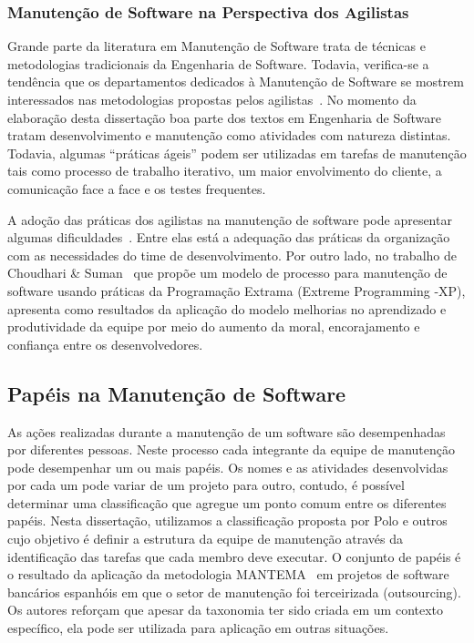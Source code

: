 \subsubsection{Manutenção de Software na Perspectiva dos Agilistas}
\label{sub:manutenção_de_software_com_método_dos_agilistas}

Grande parte da literatura em Manutenção de Software trata de técnicas e
metodologias tradicionais da Engenharia de Software. Todavia, verifica-se a
tendência que os departamentos dedicados à Manutenção de Software se mostrem
interessados nas metodologias propostas pelos agilistas~\cite{Heeager2015}.  No
momento da elaboração desta dissertação boa parte dos textos em Engenharia de
Software tratam desenvolvimento e manutenção como atividades com natureza
distintas. Todavia, algumas ``práticas ágeis'' podem ser utilizadas em tarefas
de manutenção tais como processo de trabalho iterativo, um maior envolvimento do
cliente, a comunicação face a face e os testes frequentes.

A adoção das práticas dos agilistas na manutenção de software pode apresentar
algumas dificuldades~\cite{1402140}. Entre elas está a adequação das práticas da
organização com as necessidades do time de desenvolvimento. Por outro lado, no
trabalho de Choudhari \& Suman~\cite{Choudhari:2014:EIM:2557833.2557845} que
propõe um modelo de processo para manutenção de software usando práticas da
Programação Extrama (Extreme Programming \@-\@ XP), apresenta como resultados da
aplicação do modelo melhorias no aprendizado e produtividade da equipe por meio
do aumento da moral, encorajamento e confiança entre os desenvolvedores.

\subsection{Papéis na Manutenção de Software}
\label{subsec:man_visao_geral_papeis_na_manutencao_de_software}

As ações realizadas durante a manutenção de um software são desempenhadas por
diferentes pessoas. Neste processo cada integrante da equipe de manutenção pode
desempenhar um ou mais papéis. Os nomes e as atividades desenvolvidas por cada
um pode variar de um projeto para outro, contudo, é possível determinar uma
classificação que agregue um ponto comum entre os diferentes papéis. Nesta
dissertação, utilizamos a classificação proposta por Polo e
outros~\cite{Polo1999} cujo objetivo é definir a estrutura da equipe de
manutenção através da identificação das tarefas que cada membro deve executar.
O conjunto de papéis é o resultado da aplicação da metodologia
MANTEMA~\cite{756695} em projetos de software bancários espanhóis em que o setor
de manutenção foi terceirizada (outsourcing). Os autores reforçam que apesar da
taxonomia ter sido criada em um contexto específico, ela pode ser utilizada para
aplicação em outras situações.

